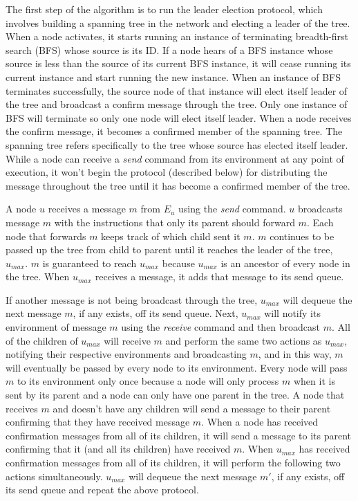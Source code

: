 \documentclass[english]{article}
\begin{document}
The first step of the algorithm is to run the leader election protocol, which involves building a spanning tree in the network and electing a leader of the tree. When a node activates, it starts running an instance of terminating breadth-first search (BFS) whose source is its ID. If a node hears of a BFS instance whose source is less than the source of its current BFS instance, it will cease running its current instance and start running the new instance. When an instance of BFS terminates successfully, the source node of that instance will elect itself leader of the tree and broadcast a confirm message through the tree. Only one instance of BFS will terminate so only one node will elect itself leader. When a node receives the confirm message, it becomes a confirmed member of the spanning tree. The spanning tree refers specifically to the tree whose source has elected itself leader. While a node can receive a \textit{send} command from its environment at any point of execution, it won't begin the protocol (described below) for distributing the message throughout the tree until it has become a confirmed member of the tree.


A node $u$ receives a message $m$ from $E_u$ using the \textit{send} command. $u$ broadcasts message $m$ with the instructions that only its parent should forward $m$. Each node that forwards $m$ keeps track of which child sent it $m$. $m$ continues to be passed up the tree from child to parent until it reaches the leader of the tree, $u_{max}$. $m$ is guaranteed to reach $u_{max}$ because $u_{max}$ is an ancestor of every node in the tree. When $u_{max}$ receives a message, it adds that message to its send queue.


If another message is not being broadcast through the tree, $u_{max}$ will dequeue the next message $m$, if any exists, off its send queue. Next, $u_{max}$ will notify its environment of message $m$ using the \textit{receive} command and then broadcast $m$. All of the children of $u_{max}$ will receive $m$ and perform the same two actions as $u_{max}$, notifying their respective environments and broadcasting $m$, and in this way, $m$ will eventually be passed by every node to its environment. Every node will pass $m$ to its environment only once because a node will only process $m$ when it is sent by its parent and a node can only have one parent in the tree. A node that receives $m$ and doesn't have any children will send a message to their parent confirming that they have received message $m$. When a node has received confirmation messages from all of its children, it will send a message to its parent confirming that it (and all its children) have received $m$. When $u_{max}$ has received confirmation messages from all of its children, it will perform the following two actions simultaneously. $u_{max}$ will dequeue the next message $m'$, if any exists, off its send queue and repeat the above protocol. 
\end{document}
